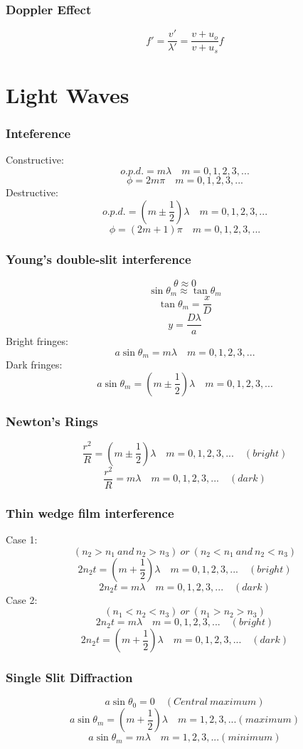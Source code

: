 \documentclass{article}
\begin{document}
\subsubsection*{Doppler Effect}
\[f'=\frac{v'}{\lambda'}=\frac{v+u_o}{v+u_s}f\]

\section{Light Waves}
\subsubsection*{Inteference}
Constructive:\[o.p.d.=m\lambda\quad m=0,1,2,3,...\]\[\phi=2m\pi\quad m=0,1,2,3,...\]
Destructive: \[o.p.d.=(m\pm\frac{1}{2})\lambda\quad m=0,1,2,3,...\]\[\phi=(2m+1)\pi\quad m=0,1,2,3,...\]

\subsubsection*{Young's double-slit interference}
\[\theta\approx 0\]\[\sin\theta_m\approx\tan\theta_m\]\[\tan\theta_m=\frac{x}{D}\]\[y=\frac{D\lambda}{a}\]
Bright fringes: \[a\sin\theta_m=m\lambda\quad m=0,1,2,3,...\]
Dark fringes: \[a\sin\theta_m=(m\pm\frac{1}{2})\lambda\quad m=0,1,2,3,...\]

\subsubsection*{Newton's Rings}
\[\frac{r^2}{R}=(m\pm\frac{1}{2})\lambda\quad m=0,1,2,3,...\quad(bright)\]\[\frac{r^2}{R}=m\lambda\quad m=0,1,2,3,...\quad(dark)\]

\subsubsection*{Thin wedge film interference}
Case 1:\[(n_2>n_1\ and\ n_2>n_3)\ or\ (n_2<n_1\ and\ n_2<n_3)\]\[2n_2t=(m+\frac{1}{2})\lambda\quad m=0,1,2,3,...\quad (bright)\]\[2n_2t=m\lambda\quad m=0,1,2,3,...\quad (dark)\]
Case 2:\[(n_1<n_2<n_3)\ or\ (n_1>n_2>n_3)\]\[2n_2t=m\lambda\quad m=0,1,2,3,...\quad (bright)\]\[2n_2t=(m+\frac{1}{2})\lambda\quad m=0,1,2,3,...\quad (dark)\]

\subsubsection*{Single Slit Diffraction}
\[a\sin\theta_0=0\quad(Central\ maximum)\]\[a\sin\theta_m=(m+\frac{1}{2})\lambda\quad m=1,2,3,...(maximum)\]\[a\sin\theta_m=m\lambda\quad m=1,2,3,...(minimum)\]
\end{document}
